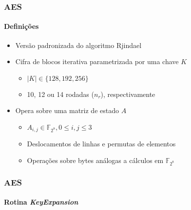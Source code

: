 \documentclass[12pt]{beamer}
\begin{document}
\begin{frame}
    \frametitle{AES}
    \framesubtitle{Definições}
    \begin{itemize}
        \item Versão padronizada do algoritmo Rjindael \cite{Daemen:2002:DR:560131}
        \item Cifra de blocos iterativa parametrizada por uma chave $K$
        \begin{itemize}
            \item $\vert K \vert \in \{128, 192, 256\}$
            \item 10, 12 ou 14 rodadas ($n_r$), respectivamente
        \end{itemize}
        \item Opera sobre uma matriz de estado $A$
        \begin{itemize}
            \item $A_{i,j} \in \mathbb{F}_{2^8}, 0 \leq i, j \leq 3$
            \item Deslocamentos de linhas e permutas de elementos
            \item Operações sobre bytes análogas a cálculos em $\mathbb{F}_{2^8}$
        \end{itemize}
    \end{itemize}
\end{frame}

\begin{frame}
    \frametitle{AES}
    \framesubtitle{Rotina \emph{KeyExpansion}}
\end{frame}
\end{document}
